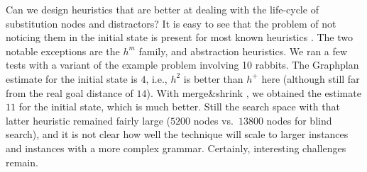 

Can we design heuristics that are better at dealing with the life-cycle
of substitution nodes and distractors? It is easy to see that the
problem of not noticing them in the initial state is present for most
known heuristics
\cite{helmert:icaps-04,richter:etal:aaai-08,karpas:domshlak-ijcai-09,helmert:domshlak:icaps-09,cai:etal:icaps-09}. The
two notable exceptions are the $h^m$ family, and abstraction
heuristics. We ran a few tests with a variant of the example problem
involving 10 rabbits.  The Graphplan estimate for the initial state is
$4$, i.e., $h^2$ is better than $h^+$ here (although still far from
the real goal distance of $14$). With merge\&shrink
\cite{helmert:etal:icaps07}, we obtained the estimate $11$ for the
initial state, which is much better. Still the search space with that
latter heuristic remained fairly large ($5200$ nodes vs.\ $13800$
nodes for blind search), and it is not clear how well the technique
will scale to larger instances and instances with a more complex
grammar. Certainly, interesting challenges remain.







